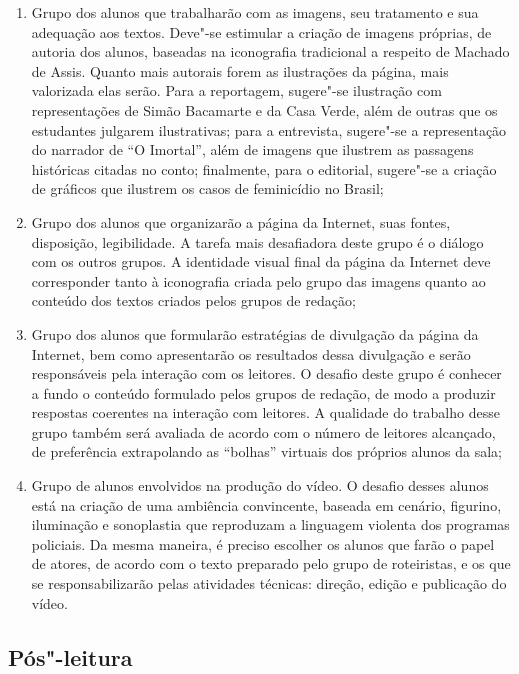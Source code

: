 \documentclass{extarticle}
\begin{document}
\begin{enumerate}
\item Grupo dos alunos que trabalharão com as imagens, seu tratamento e sua
adequação aos textos. Deve"-se estimular a criação de imagens próprias,
de autoria dos alunos, baseadas na iconografia tradicional a respeito de
Machado de Assis. Quanto mais autorais forem as ilustrações da página,
mais valorizada elas serão. Para a reportagem, sugere"-se ilustração com
representações de Simão Bacamarte e da Casa Verde, além de outras que os
estudantes julgarem ilustrativas; para a entrevista, sugere"-se a
representação do narrador de ``O Imortal'', além de imagens que ilustrem
as passagens históricas citadas no conto; finalmente, para o editorial,
sugere"-se a criação de gráficos que ilustrem os casos de feminicídio no
Brasil;

\item Grupo dos alunos que organizarão a página da Internet, suas fontes,
disposição, legibilidade. A tarefa mais desafiadora deste grupo é o
diálogo com os outros grupos. A identidade visual final da página da
Internet deve corresponder tanto à iconografia criada pelo grupo das
imagens quanto ao conteúdo dos textos criados pelos grupos de redação;

\item Grupo dos alunos que formularão estratégias de divulgação da página
da Internet, bem como apresentarão os resultados dessa divulgação e
serão responsáveis pela interação com os leitores. O desafio deste grupo
é conhecer a fundo o conteúdo formulado pelos grupos de redação, de modo
a produzir respostas coerentes na interação com leitores. A qualidade do
trabalho desse grupo também será avaliada de acordo com o número de
leitores alcançado, de preferência extrapolando as ``bolhas'' virtuais
dos próprios alunos da sala;

\item Grupo de alunos envolvidos na produção do vídeo. O desafio desses
alunos está na criação de uma ambiência convincente, baseada em cenário,
figurino, iluminação e sonoplastia que reproduzam a linguagem violenta
dos programas policiais. Da mesma maneira, é preciso escolher os alunos
que farão o papel de atores, de acordo com o texto preparado pelo grupo
de roteiristas, e os que se responsabilizarão pelas atividades técnicas:
direção, edição e publicação do vídeo.
\end{enumerate}

\subsection{Pós"-leitura}
\end{document}
